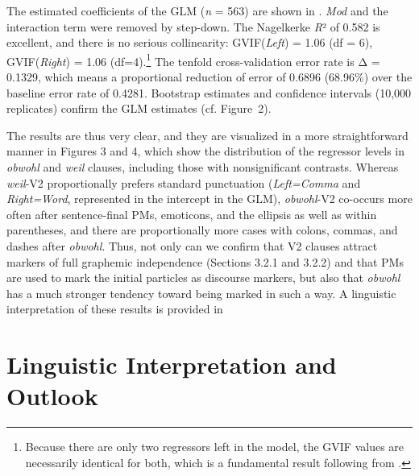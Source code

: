 The estimated coefficients of the GLM (\textit{n} = 563) are shown in . \textit{Mod} and the interaction term were removed by step-down. The Nagelkerke \textit{R}² of 0.582 is excellent, and there is no serious collinearity: GVIF(\textit{Left}) = 1.06 (df = 6), GVIF(\textit{Right}) = 1.06 (df=4).\footnote{Because there are only two regressors left in the model, the GVIF values are necessarily identical for both, which is a fundamental result following from \citet{FoxMonette1992}.} The tenfold cross-validation error rate is Δ = 0.1329, which means a proportional reduction of error of 0.6896 (68.96\%) over the baseline error rate of 0.4281. Bootstrap estimates and confidence intervals (10,000 replicates) confirm the GLM estimates (cf. Figure~2).




The results are thus very clear, and they are visualized in a more straightforward manner in Figures 3 and 4, which show the distribution of the regressor levels in \textit{obwohl} and \textit{weil} clauses, including those with nonsignificant contrasts. Whereas \textit{weil}{}-V2 proportionally prefers standard punctuation (\textit{Left=Comma} and \textit{Right=Word}, represented in the intercept in the GLM), \textit{obwohl}{}-V2 co-occurs more often after sentence-final PMs, emoticons, and the ellipsis as well as within parentheses, and there are proportionally more cases with colons, commas, and dashes after \textit{obwohl}. Thus, not only can we confirm that V2 clauses attract markers of full graphemic independence (Sections 3.2.1 and 3.2.2) and that PMs are used to mark the initial particles as discourse markers, but also that \textit{obwohl} has a much stronger tendency toward being marked in such a way. A linguistic interpretation of these results is provided in 







\section{Linguistic Interpretation and Outlook}



